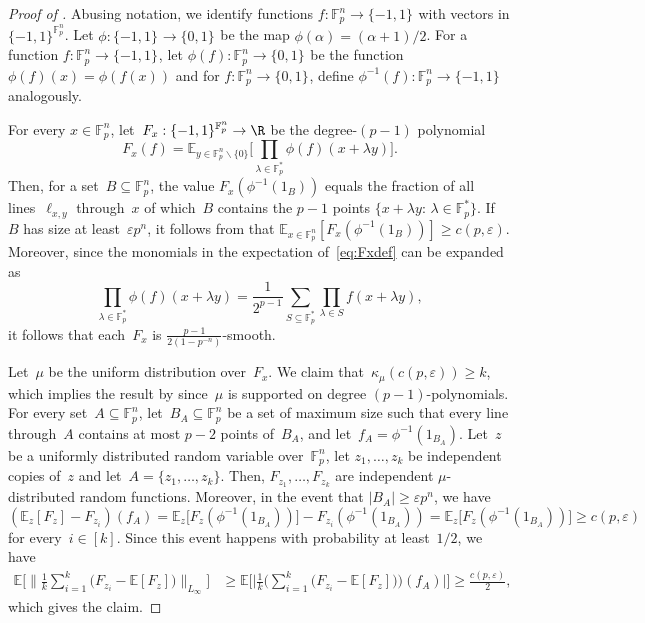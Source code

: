\documentclass{toc}
\newcommand{\bset}[1]{\{0,1\}^{#1}} %
\newcommand{\pmset}[1]{\{-1,1\}^{#1}} %
\newcommand{\Exp}{{\mathbb{E}}}
\newcommand{\st}{:\,} %
\newcommand{\eps}{\varepsilon}
\newcommand{\F}{{\mathbb{F}}}
\newcommand{\beq}{\begin{equation}}
\newcommand{\eeq}{\end{equation}}
\newcommand{\beqn}{\begin{equation*}}
\newcommand{\eeqn}{\end{equation*}}
\begin{document}
\begin{proof}[Proof of ]
  Abusing notation, we identify functions $f:\F_p^n\to\pmset{}$ with
  vectors in $\pmset{\F_p^n}$.  Let $\phi:\pmset{} \to\bset{}$ be the
  map $\phi(\alpha) = (\alpha+1)/2$.  For a function
  $f:\F_p^n\to\pmset{}$, let $\phi(f):\F_p^n\to\bset{}$ be the
  function $\phi(f)(x) = \phi(f(x))$ and for $f:\F_p^n\to\bset{}$,
  define $\phi^{-1}(f):\F_p^n\to\pmset{}$ analogously.

For every $x\in \F_p^n$, let~$F_{x}:\pmset{\F_p^n}\to\R$ be the degree-$(p-1)$ polynomial
\beq\label{eq:Fxdef}
F_x(f) = \Exp_{y\in\F_p^n\smallsetminus\{0\}}\Bigg[\prod_{\lambda\in\F_p^*}\phi(f)(x + \lambda y)\Bigg].
\eeq
Then, for a set~$B\subseteq\F_p^n$, the value $F_x(\phi^{-1}(1_B))$ equals the fraction of all 
 lines~$\ell_{x,y}$ %
  through~$x$ of which~$B$ contains the $p-1$ points $\{x + \lambda y\st \lambda\in \F_p^*\}$.
If~$B$ has size at least~$\eps p^n$, it follows from  that 
$\Exp_{x\in\F_p^n}[F_x(\phi^{-1}(1_B))] \geq c(p,\eps)$.
Moreover, since the monomials in the expectation of~\eqref{eq:Fxdef}  can be expanded as
\beqn
\prod_{\lambda\in\F_p^*}\phi(f)(x + \lambda y)
=
\frac{1}{2^{p-1}}\sum_{S\subseteq \F_p^*}\prod_{\lambda\in S}f(x + \lambda y),
\eeqn
it follows that each~$F_x$ is $\frac{p-1}{2(1-p^{-n})}$-smooth.

Let~$\mu$ be the uniform distribution over~$F_x$.
We claim that~$\kappa_\mu(c(p,\eps)) \geq k$, which implies the result by  since~$\mu$ is supported on degree $(p-1)$-polynomials.
For every set~$A\subseteq \F_p^n$, let~$B_A\subseteq\F_p^n$ be a set of maximum size
such that
every  line %
through~$A$ contains at most $p-2$ points of~$B_A$,
and let~$f_A = \phi^{-1}(1_{B_A})$.
Let~$z$ be a uniformly distributed random variable over~$\F_p^n$, let  $z_1,\dots,z_k$ be independent copies of~$z$ and let~$A = \{z_1,\dots,z_k\}$.
Then, $F_{z_1},\dots,F_{z_k}$ are independent $\mu$-distributed random functions.
Moreover, in the event that $|B_A| \geq \eps p^n$, we have
\beqn
(\Exp_z[F_z]-F_{z_i})(f_A)
=
\Exp_z\big[F_z(\phi^{-1}(1_{B_A}))\big] - F_{z_i}(\phi^{-1}(1_{B_A}))
= \Exp_z\big[F_z(\phi^{-1}(1_{B_A}))\big]
 \geq c(p,\eps)
\eeqn
for every~$i\in[k]$.
Since this event happens with probability at least~$1/2$, we have
\begin{align*}
\Exp\Big[\Big\|\frac{1}{k}\sum_{i=1}^k\big(F_{z_i} - \Exp[F_{z}]\big)\Big\|_{L_\infty}\Big]
&\geq
\Exp\Big[\Big|\frac{1}{k}\Big(\sum_{i=1}^k\big(F_{z_i} - \Exp[F_{z}]\big)\Big)(f_A)\Big|\Big]
\geq
\frac{c(p,\eps)}{2},
\end{align*}
which gives the claim.
\end{proof}
\end{document}

